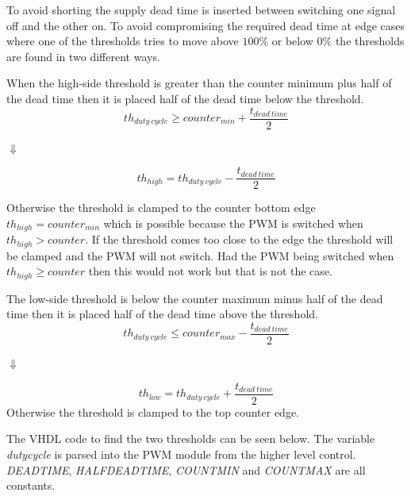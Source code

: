 To avoid shorting the supply dead time is inserted between switching one signal off and the other on.
To avoid compromising the required dead time at edge cases where one of the thresholds tries to move above $100 \%$ or  below $0 \%$ the thresholds are found in two different ways.

When the high-side threshold is greater than the counter minimum plus half of the dead time then it is placed half of the dead time below the threshold.
\begin{equation}
    th_{duty \ cycle} \geq  counter_{min} + \frac{t_{dead \ time}}{2}
\end{equation}
\begin{center}
    $\Downarrow$    
\end{center}
\begin{equation}
   th_{high} = th_{duty \ cycle} - \frac{t_{dead \ time}}{2}  
\end{equation}

Otherwise the threshold is clamped to the counter bottom edge $th_{high} = counter_{min}$ which is possible because the PWM is switched when $th_{high} > counter$.
If the threshold comes too close to the edge the threshold will be clamped and the PWM will not switch. Had the PWM being switched when $th_{high} \geq counter$ then this would not work but that is not the case.



The low-side threshold is below the counter maximum minus half of the dead time then it is placed half of the dead time above the threshold.
\begin{equation}
    th_{duty \ cycle}\leq counter_{max} - \frac{t_{dead \ time}}{2}
\end{equation}
\begin{center}
    $\Downarrow$
\end{center}
\begin{equation}
  th_{low} = th_{duty \ cycle} + \frac{t_{dead \ time}}{2}  
\end{equation}
Otherwise the threshold is clamped to the top counter edge.

The VHDL code to find the two thresholds can be seen below. The variable \textit{duty\textunderscore cycle} is parsed into the PWM module from the higher level control. \textit{DEADTIME}, \textit{HALF\textunderscore DEADTIME}, \textit{COUNT\textunderscore MIN} and \textit{COUNT\textunderscore MAX} are all constants.

